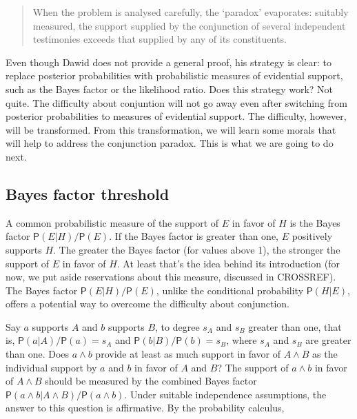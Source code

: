 \documentclass[10pt,dvipsnames,enabledeprecatedfontcommands]{scrartcl}
\newcommand{\et}{\wedge}
\newcommand{\pr}[1]{\mathsf{P}(#1)}
\begin{document}
\begin{quote} When the problem is analysed carefully, the `paradox' evaporates: suitably measured, 
 the support supplied by the conjunction of several independent 
 testimonies exceeds that supplied by any of its constituents.
 \end{quote}

\noindent Even though Dawid does not provide a general
proof, his strategy is
clear: to replace posterior probabilities with probabilistic measures of
evidential support, such as the Bayes factor or the likelihood ratio.
Does this strategy work? Not quite. The difficulty about conjuntion will
not go away even after switching from posterior probabilities to
measures of evidential support. The difficulty, however, will be
transformed. From this transformation, we will learn some morals that
will help to address the conjunction paradox. This is what we are going
to do next.

\hypertarget{bayes-factor-threshold}{%
\subsection{Bayes factor threshold}\label{bayes-factor-threshold}}

A common probabilistic measure of the support of \(E\) in favor of \(H\)
is the Bayes factor \(\pr{E | H}/\pr{E}\). If the Bayes factor is
greater than one, \(E\) positively supports \(H\). The greater the Bayes
factor (for values above 1), the stronger the support of \(E\) in favor
of \(H\). At least that's the idea behind its introduction (for now, we
put aside reservations about this measure, discussed in CROSSREF). The
Bayes factor \(\pr{E | H}/\pr{E}\), unlike the conditional probability
\(\pr{H | E}\), offers a potential way to overcome the difficulty about
conjunction.

Say \(a\) supports \(A\) and \(b\) supports \(B\), to degree \(s_A\) and
\(s_B\) greater than one, that is, \(\pr{a | A}/\pr{a}=s_A\) and
\(\pr{b | B}/\pr{b}=s_B\), where \(s_A\) and \(s_B\) are greater than
one. Does \(a \wedge b\) provide at least as much support in favor of
\(A \wedge B\) as the individual support by \(a\) and \(b\) in favor of
\(A\) and \(B\)? The support of \(a\et b\) in favor of \(A\et B\) should
be measured by the combined Bayes factor
\(\pr{a \wedge b| A\wedge B}/\pr{a \wedge b}\). Under suitable
independence assumptions, the answer to this question is affirmative. By
the probability calculus,
\end{document}
